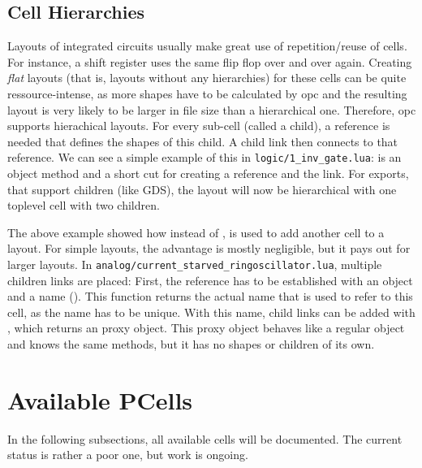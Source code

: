 \subsection{Cell Hierarchies}
Layouts of integrated circuits usually make great use of repetition/reuse of cells. For instance, a shift register uses the same flip flop over and over again.
Creating \emph{flat} layouts (that is, layouts without any hierarchies) for these cells can be quite ressource-intense, as more shapes have to be calculated by
opc and the resulting layout is very likely to be larger in file size than a hierarchical one. Therefore, opc supports hierachical layouts. For every sub-cell
(called a child), a reference is needed that defines the shapes of this child. A child link then connects to that reference. We can see a simple example of this
in \texttt{logic/1\_inv\_gate.lua}:
 is an object method and a short cut for creating a reference and the link. For exports, that support children (like GDS), the layout will
now be hierarchical with one toplevel cell with two children. 

The above example showed how instead of ,  is used to add another cell to a layout. For simple layouts, the
advantage is mostly negligible, but it pays out for larger layouts. In \texttt{analog/current\_starved\_ringoscillator.lua}, multiple children links are placed:
First, the reference has to be established with an object and a name (). This function returns the actual name that is used to
refer to this cell, as the name has to be unique. With this name, child links can be added with , which returns an proxy object. This
proxy object behaves like a regular object and knows the same methods, but it has no shapes or children of its own.

\section{Available PCells}
In the following subsections, all available cells will be documented. The current status is rather a poor one, but work is ongoing.
